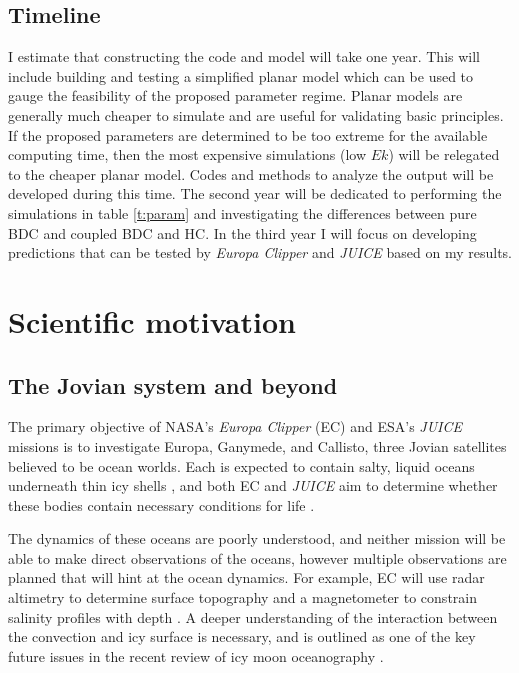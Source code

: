 \documentclass[12pt]{article}
\begin{document}
 \subsection{Timeline}
 I estimate that constructing the code and model will take one year. This will include building and testing a simplified planar model which can be used to gauge the feasibility of the proposed parameter regime. Planar models are generally much cheaper to simulate and are useful for validating basic principles. If the proposed parameters are determined to be too extreme for the available computing time, then the most expensive simulations (low $Ek$) will be relegated to the cheaper planar model. Codes and methods to analyze the output will be developed during this time. The second year will be dedicated to performing the simulations in table \ref{t:param} and investigating the differences between pure BDC and coupled BDC and HC. In the third year I will focus on developing predictions that can be tested by \textit{Europa Clipper} and \textit{JUICE} based on my results.%

\section{Scientific motivation}
\subsection{The Jovian system and beyond}
The primary objective of NASA's \textit{Europa Clipper} (EC)\cite{pC14_EC} and ESA's \textit{JUICE} \citep{oG13} missions is to investigate Europa, Ganymede, and Callisto, three Jovian satellites believed to be ocean worlds. Each is expected to contain salty, liquid oceans underneath thin icy shells \citep{rP99,fN16}, and both EC and \textit{JUICE} aim to determine whether these bodies contain necessary conditions for life \citep{tB24}. 

The dynamics of these oceans are poorly understood, and neither mission will be able to make direct observations of the oceans, however multiple observations are planned that will hint at the ocean dynamics. For example, EC will use radar altimetry to determine surface topography and a magnetometer to constrain salinity profiles with depth \citep{jR23}.  
A deeper understanding of the interaction between the convection and icy surface is necessary, and is outlined as one of the key future issues in the recent review of icy moon oceanography \citep{kS24}.
\end{document}
